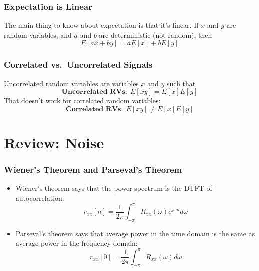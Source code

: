 \documentclass{beamer}
\begin{document}
\begin{frame}
  \frametitle{Expectation is Linear}

  The main thing to know about expectation is that it's linear.  If
  $x$ and $y$ are random variables, and $a$ and $b$ are deterministic
  (not random), then
  \begin{displaymath}
    E\left[ax+by\right] = aE\left[x\right] + bE\left[y\right]
  \end{displaymath}
\end{frame}

\begin{frame}
  \frametitle{Correlated vs.~Uncorrelated Signals}

  Uncorrelated random variables are variables $x$ and $y$ such that
  \begin{displaymath}
    \textbf{Uncorrelated RVs:}~~E\left[xy\right]=E\left[x\right] E\left[y\right]
  \end{displaymath}
  That doesn't work for correlated random variables:
  \begin{displaymath}
    \textbf{Correlated RVs:}~~E\left[xy\right]\ne E\left[x\right] E\left[y\right]
  \end{displaymath}
\end{frame}

\section[Review]{Review: Noise}
\setcounter{subsection}{1}

\begin{frame}
  \frametitle{Wiener's Theorem and Parseval's Theorem}
  \begin{itemize}
  \item Wiener's theorem says that the power spectrum is the DTFT of
    autocorrelation:
    \begin{displaymath}
      r_{xx}[n] = \frac{1}{2\pi}\int_{-\pi}^\pi R_{xx}(\omega)e^{j\omega n}d\omega
    \end{displaymath}
  \item Parseval's theorem says that average power in the time domain
    is the same as average power in the frequency domain:
    \begin{displaymath}
      r_{xx}[0] = \frac{1}{2\pi}\int_{-\pi}^\pi R_{xx}(\omega)d\omega
    \end{displaymath}
  \end{itemize}
\end{frame}
\end{document}
